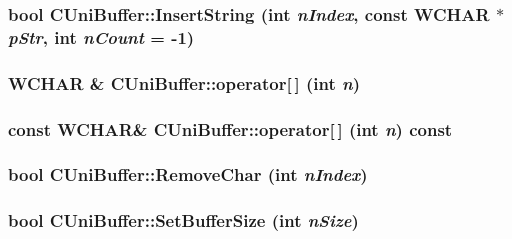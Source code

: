\label{class_c_uni_buffer_a23dfb66bd7d577ca78d55f387945b635}
\hypertarget{class_c_uni_buffer_a7c4687bd6d8d4cafd7842b9097089c8e}{
\subsubsection[{InsertString}]{\setlength{\rightskip}{0pt plus 5cm}bool CUniBuffer::InsertString (int {\em nIndex}, \/  const WCHAR $\ast$ {\em pStr}, \/  int {\em nCount} = {\ttfamily -\/1})}}
\label{class_c_uni_buffer_a7c4687bd6d8d4cafd7842b9097089c8e}
\hypertarget{class_c_uni_buffer_ae763d81a4be9f18f82dcf389184892b7}{
\subsubsection[{operator[]}]{\setlength{\rightskip}{0pt plus 5cm}WCHAR \& CUniBuffer::operator\mbox{[}$\,$\mbox{]} (int {\em n})}}
\label{class_c_uni_buffer_ae763d81a4be9f18f82dcf389184892b7}
\hypertarget{class_c_uni_buffer_a1d875e8c38094170c15cb551817bbedf}{
\subsubsection[{operator[]}]{\setlength{\rightskip}{0pt plus 5cm}const WCHAR\& CUniBuffer::operator\mbox{[}$\,$\mbox{]} (int {\em n}) const}}
\label{class_c_uni_buffer_a1d875e8c38094170c15cb551817bbedf}
\hypertarget{class_c_uni_buffer_a2b0be4cc48030eab8027b9c27c11b3ba}{
\subsubsection[{RemoveChar}]{\setlength{\rightskip}{0pt plus 5cm}bool CUniBuffer::RemoveChar (int {\em nIndex})}}
\label{class_c_uni_buffer_a2b0be4cc48030eab8027b9c27c11b3ba}
\hypertarget{class_c_uni_buffer_ac1584ce27e2969eb9a33159a15d0b1e6}{
\subsubsection[{SetBufferSize}]{\setlength{\rightskip}{0pt plus 5cm}bool CUniBuffer::SetBufferSize (int {\em nSize})}}
